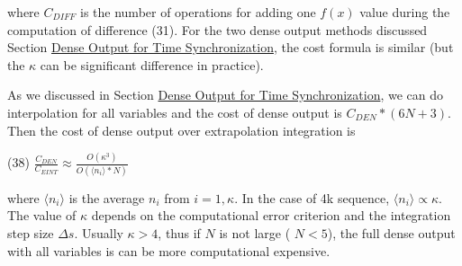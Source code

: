 where $ C_{DIFF} $ is the number of operations for adding one $ f(x) $ value during the computation of difference (31). For the two dense output methods discussed Section \hyperlink{index_dense_sec}{Dense Output for Time Synchronization}, the cost formula is similar (but the $ \kappa $ can be significant difference in practice).

As we discussed in Section \hyperlink{index_dense_sec}{Dense Output for Time Synchronization}, we can do interpolation for all variables and the cost of dense output is $ C_{DEN}*(6N+3) $. Then the cost of dense output over extrapolation integration is

(38) $ \frac{C_{DEN}}{C_{EINT}} \approx \frac{O(\kappa^3)}{O(\langle n_i\rangle*N)} $

where $\langle n_i\rangle$ is the average $ n_i $ from $ i=1,\kappa$. In the case of 4k sequence, $\langle n_i\rangle \propto \kappa$. The value of $\kappa$ depends on the computational error criterion and the integration step size $ \Delta s$. Usually $ \kappa>4 $, thus if $ N $ is not large ( $ N < 5 $), the full dense output with all variables is can be more computational expensive. 